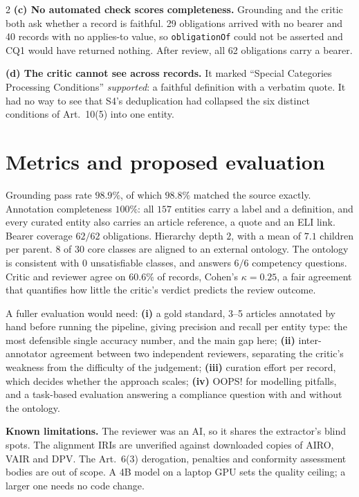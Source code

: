 \documentclass[10pt,a4paper]{article}
\begin{document}
\begin{multicols}{2}
\textbf{(c) No automated check scores completeness.} Grounding and the critic both ask whether a
record is faithful. 29 obligations arrived with no bearer and 40 records with no applies-to value, so \texttt{obligationOf} could not be asserted and CQ1 would have returned nothing. After review, all 62 obligations carry a bearer.

\textbf{(d) The critic cannot see across records.} It marked ``Special Categories Processing
Conditions'' \emph{supported}: a faithful definition with a verbatim quote. It had no way to see that
S4's deduplication had collapsed the six distinct conditions of Art.~10(5) into one entity.

\section{Metrics and proposed evaluation}

Grounding pass rate $98.9\%$, of which $98.8\%$ matched the source exactly.
Annotation completeness $100\%$: all $157$ entities carry a label and a definition, and every curated
entity also carries an article reference, a quote and an ELI link.
Bearer coverage $62/62$ obligations.
Hierarchy depth $2$, with a mean of $7.1$ children per parent.
$8$ of $30$ core classes are aligned to an external ontology.
The ontology is consistent with $0$ unsatisfiable classes, and answers $6/6$ competency questions.
Critic and reviewer agree on $60.6\%$ of records, Cohen's $\kappa = 0.25$, a fair agreement that
quantifies how little the critic's verdict predicts the review outcome.

A fuller evaluation would need: \textbf{(i)} a gold standard, 3--5 articles annotated by hand before
running the pipeline, giving precision and recall per entity type: the most defensible single
accuracy number, and the main gap here; \textbf{(ii)} inter-annotator agreement between two
independent reviewers, separating the critic's weakness from the difficulty of the judgement;
\textbf{(iii)} curation effort per record, which decides whether the approach scales;
\textbf{(iv)} OOPS! for modelling pitfalls, and a task-based evaluation answering a compliance
question with and without the ontology.

\textbf{Known limitations.} The reviewer was an AI, so it shares the extractor's blind spots. The
alignment IRIs are unverified against downloaded copies of AIRO, VAIR and DPV. The Art.~6(3)
derogation, penalties and conformity assessment bodies are out of scope. A 4B model on a laptop GPU
sets the quality ceiling; a larger one needs no code change.

\end{multicols}
\end{document}

